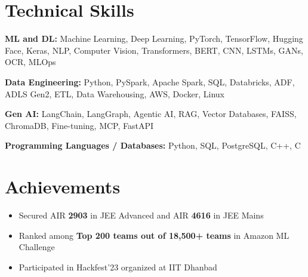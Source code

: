 \documentclass[a4paper,10pt]{article}
\begin{document}
\section{Technical Skills}

\small
\textbf{ML and DL:}
Machine Learning, Deep Learning, PyTorch, TensorFlow, Hugging Face, Keras, NLP, Computer Vision, Transformers, BERT, CNN, LSTMs, GANs, OCR, MLOps

\vspace{2pt}

\textbf{Data Engineering:}
Python, PySpark, Apache Spark, SQL, Databricks, ADF, ADLS Gen2, ETL, Data Warehousing, AWS, Docker, Linux

\vspace{2pt}

\textbf{Gen AI:}
LangChain, LangGraph, Agentic AI, RAG, Vector Databases, FAISS, ChromaDB, Fine-tuning, MCP, FastAPI

\vspace{2pt}

\textbf{Programming Languages / Databases:}
Python, SQL, PostgreSQL, C++, C

\section{Achievements}

\begin{itemize}[leftmargin=0.18in,itemsep=2pt]
\item Secured AIR \textbf{2903} in JEE Advanced and AIR \textbf{4616} in JEE Mains
\item Ranked among \textbf{Top 200 teams out of 18,500+ teams} in Amazon ML Challenge
\item Participated in Hackfest'23 organized at IIT Dhanbad
\end{itemize}
\end{document}
